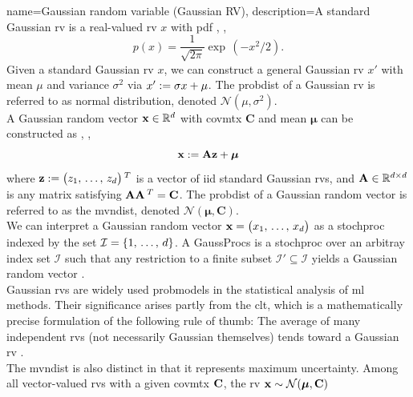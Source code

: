 {name={Gaussian random variable (Gaussian RV)},
	description={A  standard Gaussian \gls{rv} is a 
		real-valued \gls{rv} $x$ with \gls{pdf} \cite{BertsekasProb}, \cite{GrayProbBook}, \cite{papoulis}
		\begin{equation}
			\nonumber
			p(x) = \frac{1}{\sqrt{2\pi}} \exp\,(-x^2/2). 
		\end{equation}
		Given a standard Gaussian \gls{rv} $x$, we can construct a general Gaussian \gls{rv} $x'$ with 
		\gls{mean} $\mu$ and \gls{variance} $\sigma^2$ via $x' := \sigma x + \mu$. The \gls{probdist} of a 
		Gaussian \gls{rv} is referred to as normal distribution, denoted $\mathcal{N}(\mu, \sigma^2)$. 
		\\ 
		A Gaussian random \gls{vector} ${\bf x} \in \mathbb{R}^{d}$ with 
		\gls{covmtx} $\mathbf{C}$ and \gls{mean} ${\bm \mu}$ can be constructed as \cite{GrayProbBook}, \cite{papoulis}, \cite{Lapidoth09}
		\[
		{\bf x} := \mathbf{A} {\bf z} + {\bm \mu}
		\]
		where ${\bf z} := \big( z_{1}, \,\ldots, \,z_{d} \big)\,^{T}$ is a \gls{vector} 
		of \gls{iid} standard Gaussian \gls{rv}s, and ${\bf A} \in \mathbb{R}^{d \times d}$ is any \gls{matrix} satisfying ${\bf A} {\bf A}\,^{T} = {\bf C}$. 
		The \gls{probdist} of a Gaussian random \gls{vector} is referred to as the \gls{mvndist}, 
		denoted $\mathcal{N}({\bm \mu}, \mathbf{C})$.
		\\
		We can interpret a Gaussian random \gls{vector} ${\bf x}=\big(x_{1},\,\ldots,\,x_{d}\big)$ as a \gls{stochproc} 
		indexed by the set $\mathcal{I}=\{1,\,\ldots,\,d\}$. A \gls{GaussProc}s is a 
		\gls{stochproc} over an arbitray index set $\mathcal{I}$ such that any restriction to a finite subset 
		$\mathcal{I}' \subseteq \mathcal{I}$ yields a Gaussian random \gls{vector} \cite{Rasmussen2006Gaussian}.
  		\\
        		Gaussian \gls{rv}s are widely used \gls{probmodel}s in the statistical analysis of 
        		\gls{ml} methods. Their significance arises partly from the \gls{clt}, which is a mathematically 
        		precise formulation of the following rule of thumb: The average of many independent \gls{rv}s 
		(not necessarily Gaussian themselves) tends toward a Gaussian \gls{rv} \cite{ross2013first}.
		\\ 
		The \gls{mvndist} is also distinct in that it represents maximum \gls{uncertainty}. 
		Among all \gls{vector}-valued \gls{rv}s with a given \gls{covmtx} ${\bf C}$, the \gls{rv} ${\bf x} \sim \mathcal{N}({\bm \mu}, \mathbf{C})$ 
}}
